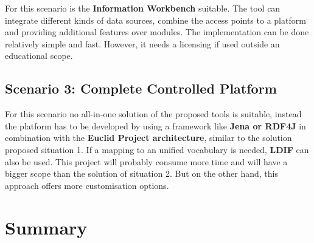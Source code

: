 For this scenario is the \textbf{Information Workbench} suitable. The tool can integrate different kinds of data sources, combine the access points to a platform and providing additional features over modules. The implementation can be done relatively simple and fast. However, it needs a licensing if used outside an educational scope.

\subsection{Scenario 3: Complete Controlled Platform}

For this scenario no all-in-one solution of the proposed tools is suitable, instead the platform has to be developed by using a framework like \textbf{Jena or RDF4J} in combination with the \textbf{Euclid Project architecture}, similar to the solution proposed situation 1. If a mapping to an unified vocabulary is needed, \textbf{LDIF} can also be used. This project will probably consume more time and will have a bigger scope than the solution of situation 2. But on the other hand, this approach offers more customisation options.

\section{Summary}

